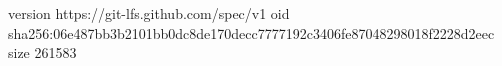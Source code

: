 version https://git-lfs.github.com/spec/v1
oid sha256:06e487bb3b2101bb0dc8de170decc7777192c3406fe87048298018f2228d2eec
size 261583
